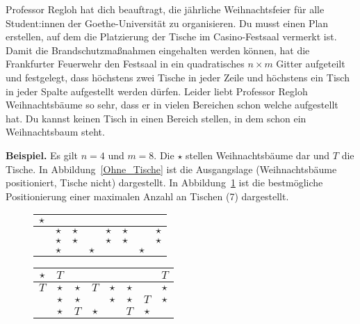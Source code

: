 \documentclass{uebung_cs}
\begin{document}
\begin{aufgabe}[Weihnachtsbäume]
    Professor Regloh hat dich beauftragt, die jährliche Weihnachtsfeier für alle Student:innen der Goethe-Universität zu organisieren. Du musst einen Plan erstellen, auf dem die Platzierung der Tische im Casino-Festsaal vermerkt ist. Damit die Brandschutzmaßnahmen eingehalten werden können, hat die Frankfurter Feuerwehr den Festsaal in ein quadratisches $n \times m$ Gitter aufgeteilt und festgelegt, dass höchstens zwei Tische in jeder Zeile und höchstens ein Tisch in jeder Spalte aufgestellt werden dürfen. Leider liebt Professor Regloh Weihnachtsbäume so sehr, dass er in vielen Bereichen schon welche aufgestellt hat. Du kannst keinen Tisch in einen Bereich stellen, in dem schon ein Weihnachtsbaum steht.
    
    \textbf{Beispiel.} Es gilt $n = 4$ und $m = 8$. Die $\star$ stellen Weihnachtsbäume dar und $T$ die Tische. In Abbildung~\ref{Ohne_Tische} ist die Ausgangslage (Weihnachtsbäume positioniert, Tische nicht) dargestellt. In Abbildung~\ref{Mit Tischen} ist die bestmögliche Positionierung einer maximalen Anzahl an Tischen (7) dargestellt.
   
    \begin{figure}[h]
    \centering
    \begin{minipage}{0.4\textwidth}
    	\begin{tabular}{|c|c|c|c|c|c|c|c|}
    		\hline 
		    \rule[-1ex]{0pt}{2.5ex} $\star$ &  &  &  &  &  &  &  \\ 
    		\hline 
	    	\rule[-1ex]{0pt}{2.5ex}  & $\star$ & $\star$ &  & $\star$ & $\star$ &  & $\star$ \\ 
	    	\hline 
		    \rule[-1ex]{0pt}{2.5ex}  & $\star$ & $\star$ &  & $\star$ & $\star$ &  & $\star$ \\ 
    		\hline 
		    \rule[-1ex]{0pt}{2.5ex}  & $\star$ &  & $\star$ &  &  & $\star$ &  \\ 
    		\hline 
    	\end{tabular}
    	\caption{\label{Ohne_Tische}}
    \end{minipage}
    \begin{minipage}{0.4\textwidth}
    	\begin{tabular}{|c|c|c|c|c|c|c|c|}
		    \hline 
    		\rule[-1ex]{0pt}{2.5ex} $\star$ & $T$ &  &  &  &  &  & $T$ \\ 
	    	\hline 
	    	\rule[-1ex]{0pt}{2.5ex} $T$ & $\star$ & $\star$ & $T$ & $\star$ & $\star$ &  & $\star$ \\ 
		    \hline 
    		\rule[-1ex]{0pt}{2.5ex}  & $\star$ & $\star$ &  & $\star$ & $\star$ & $T$ & $\star$ \\ 
		    \hline 
    		\rule[-1ex]{0pt}{2.5ex}  & $\star$ & $T$ & $\star$ &  & $T$ & $\star$ &  \\ 
	    	\hline 
    	\end{tabular}
    	\caption{\label{Mit Tischen}}
    \end{minipage}
    \end{figure}
     

\end{aufgabe}
\end{document}
